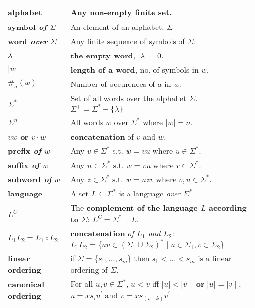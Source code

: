 \begin{tabu} to 
  alphabet \norm{($\Sigma$)} & Any non-empty finite set.\\ \hline
  symbol {\it of $\Sigma$} & An element of an alphabet.
  $\Sigma$\\ \hline
  word {\it over $\Sigma$} & Any finite sequence of symbols of $\Sigma$.
  \\ \hline
  $\lambda$ & {\bf the empty word}, $\mid\lambda\mid = 0$. \\ \hline
  $\mid w \mid$ & {\bf length of a word}, no. of symbols in $w$. \\ \hline
  $\#_a(w)$ & Number of occurences of $a$ in $w$. \\ \hline
  $\Sigma^*$ & Set of all words over the alphabet $\Sigma$. \newline
  $\Sigma^+ = \Sigma^* - \{\lambda\}$ \\ \hline
  $\Sigma^n$ & All words $w$ over $\Sigma^*$ where $\mid w \mid = n$.
  \\ \hline
  $vw$ or $v \cdot w$ & {\bf concatenation} of $v$ and $w$. \\ \hline
  prefix {\it of} $w$ & Any $v \in \Sigma^*$ s.t. $w = vu$ where $u \in \Sigma^*$.
  \\ \hline
  suffix {\it of} $w$ & Any $u \in \Sigma^*$ s.t. $w = vu$ where $v \in \Sigma^*$.
  \\ \hline
  subword {\it of} $w$ & Any $z \in \Sigma^*$ s.t. $w = uzv$ where  $v, u \in
  \Sigma^*$. \\ \hline
  language  & A set $L \subseteq \Sigma^*$ is a language {\it over}
  $\Sigma^*$. \\ \hline
  $L^C$ & The {\bf complement of the language $L$ according to $\Sigma$}:
  $L^C = \Sigma^* - L$. \\ \hline
  $L_1L_2 = L_1 \circ L_2$ & {\bf concatenation} {\it of $L_1$ and $L_2$}: \newline
  $L_1L_2 = \{uv \in \left(\Sigma_1 \cup \Sigma_2 \right)^* \mid u \in \Sigma_1,
  v \in \Sigma_2\}$ \\ \hline
  linear \newline ordering & if $\Sigma = \{s_1, \ldots, s_m\}$ then
  $s_1 < \ldots < s_m$ is a linear ordering of $\Sigma$. \\ \hline
  canonical \newline ordering & For all $u,v \in \Sigma^*$, $u < v$ iff $\mid u
  \mid < \mid v \mid$ {\bf or} $\mid u \mid = \mid v \mid$, $u = xs_iu^\prime$
  and $v = xs_{(i+k)}v^\prime$ \\ \hline
\end{tabu}
